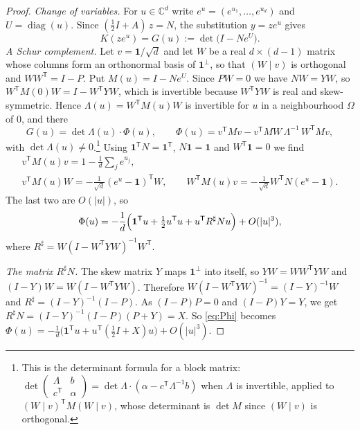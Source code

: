 \documentclass[11pt,a4paper,reqno]{amsart}
\theoremstyle{remark}
\numberwithin{equation}{section}
\newcommand{\one}{\mathbf{1}}
\newcommand{\T}{\mathsf{T}}
\newcommand{\C}{\mathbb{C}}
\begin{document}
\begin{proof}
\emph{Change of variables.} For $u\in\C^d$ write $e^u=(e^{u_1},\dots,e^{u_d})$ and $U=\operatorname{diag}(u)$. Since $(\tfrac12I+A)\,z=N$, the substitution $y=ze^u$ gives
\[
K(ze^{u})=G(u):=\det\bigl(I-Ne^{U}\bigr).
\]
\emph{A Schur complement.} Let $v=\one/\sqrt d$ and let $W$ be a real $d\times(d-1)$ matrix whose columns form an orthonormal basis of $\one^\perp$, so that $(W\mid v)$ is orthogonal and $WW^\T=I-P$. Put $M(u)=I-Ne^U$. Since $PW=0$ we have $NW=YW$, so $W^\T M(0)W=I-W^\T YW$, which is invertible because $W^\T YW$ is real and skew-symmetric. Hence $\Lambda(u)=W^\T M(u)W$ is invertible for $u$ in a neighbourhood $\Omega$ of $0$, and there
\[
G(u)=\det\Lambda(u)\cdot\Phi(u),\qquad \Phi(u)=v^\T Mv-v^\T MW\,\Lambda^{-1}\,W^\T Mv,
\]
with $\det\Lambda(u)\ne0$.\footnote{This is the determinant formula for a block matrix: $\det\begin{pmatrix}\Lambda&b\\c^\T&\alpha\end{pmatrix}=\det\Lambda\cdot(\alpha-c^\T\Lambda^{-1}b)$ when $\Lambda$ is invertible, applied to $(W\mid v)^\T M(W\mid v)$, whose determinant is $\det M$ since $(W\mid v)$ is orthogonal.} Using $\one^\T N=\one^\T$, $N\one=\one$ and $W^\T\one=0$ we find
\begin{gather*}
v^\T M(u)v=1-\tfrac1d\textstyle\sum_je^{u_j},\\
v^\T M(u)W=-\tfrac1{\sqrt d}(e^u-\one)^\T W,\qquad W^\T M(u)v=-\tfrac1{\sqrt d}W^\T N(e^u-\one).
\end{gather*}
The last two are $O(|u|)$, so
\begin{equation}\label{eq:Phi}
\Phi(u)=-\frac1d\Bigl(\one^\T u+\tfrac12u^\T u+u^\T R^\sharp Nu\Bigr)+O(|u|^3),
\end{equation}
where $R^\sharp=W(I-W^\T YW)^{-1}W^\T$.

\emph{The matrix $R^\sharp N$.} The skew matrix $Y$ maps $\one^\perp$ into itself, so $YW=WW^\T YW$ and $(I-Y)W=W(I-W^\T YW)$. Therefore $W(I-W^\T YW)^{-1}=(I-Y)^{-1}W$ and $R^\sharp=(I-Y)^{-1}(I-P)$. As $(I-P)P=0$ and $(I-P)Y=Y$, we get $R^\sharp N=(I-Y)^{-1}(I-P)(P+Y)=X$. So \eqref{eq:Phi} becomes $\Phi(u)=-\frac1d\bigl(\one^\T u+u^\T(\tfrac12I+X)u\bigr)+O(|u|^3)$.


\end{proof}
\end{document}

